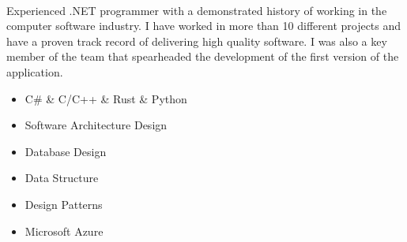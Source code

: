 \documentclass[a4paper]{developercv} %
\begin{document}
\vspace{0.5cm}


\begin{minipage}[t]{0.5\textwidth} %
	\vspace{-\baselineskip} %
	\\\par
	Experienced .NET programmer with a demonstrated history of working in the computer software industry.
	I have worked in more than 10 different projects and have a proven track record of delivering high quality software.
	I was also a key member of the team that spearheaded the development of the first version of the application.
\end{minipage}
\hfill %
\begin{minipage}[t]{0.4\textwidth} %
	\vspace{-\baselineskip} %
	\begin{itemize}[noitemsep]
		\item C\# \& C/C++ \& Rust \& Python
		\item Software Architecture Design
		\item Database Design
		\item Data Structure
		\item Design Patterns
		\item Microsoft Azure
	\end{itemize}
\end{minipage}

\end{document}
